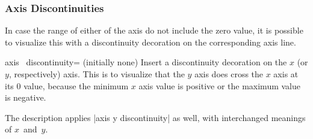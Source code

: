 \subsubsection{Axis Discontinuities}
In case the range of either of the axis do not include the zero value, it is possible to visualize this with a discontinuity decoration on the corresponding axis line.

\begin{pgfplotsxykey}{axis \x\ discontinuity= (initially none)}
Insert a discontinuity decoration on the $x$ (or $y$, respectively) axis. 
This is to visualize that the $y$ axis does cross the $x$ axis at its $0$ value, because the minimum $x$ axis value is positive or the maximum value is negative.

The description applies |axis y discontinuity| as well, with interchanged meanings of $x$~and~$y$.

\begin{codeexample}[]
\end{codeexample}

\begin{codeexample}[]
\end{codeexample}
\end{pgfplotsxykey}



